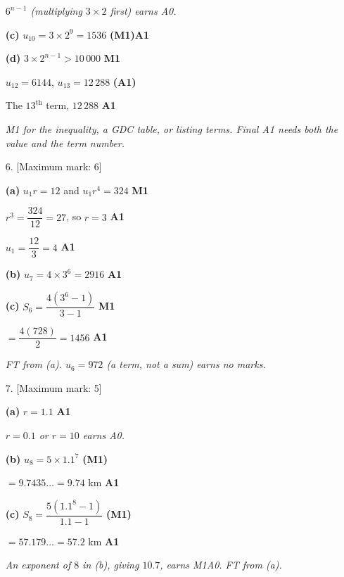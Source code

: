 \documentclass[12pt, twoside]{article}
\begin{document}
\begin{enumerate}[itemsep=0.3cm]
\emph{$6^{n - 1}$ (multiplying $3 \times 2$ first) earns A0.}

\textbf{(c)} $u_{10} = 3 \times 2^{9} = 1536$ \hfill \textbf{(M1)A1}

\textbf{(d)} $3 \times 2^{n - 1} > 10\,000$ \hfill \textbf{M1}

$u_{12} = 6144$, \quad $u_{13} = 12\,288$ \hfill \textbf{(A1)}

The $13^{\text{th}}$ term, $12\,288$ \hfill \textbf{A1}

\emph{M1 for the inequality, a GDC table, or listing terms. Final A1 needs
both the value and the term number.}

\medskip

\item[6.] [Maximum mark: 6]

\textbf{(a)} $u_{1}r = 12$ and $u_{1}r^{4} = 324$ \hfill \textbf{M1}

$r^{3} = \dfrac{324}{12} = 27$, so $r = 3$ \hfill \textbf{A1}

$u_{1} = \dfrac{12}{3} = 4$ \hfill \textbf{A1}

\textbf{(b)} $u_{7} = 4 \times 3^{6} = 2916$ \hfill \textbf{A1}

\textbf{(c)} $S_{6} = \dfrac{4\left(3^{6} - 1\right)}{3 - 1}$
\hfill \textbf{M1}

$= \dfrac{4(728)}{2} = 1456$ \hfill \textbf{A1}

\emph{FT from (a). $u_{6} = 972$ (a term, not a sum) earns no marks.}

\newpage

\item[7.] [Maximum mark: 5]

\textbf{(a)} $r = 1.1$ \hfill \textbf{A1}

\emph{$r = 0.1$ or $r = 10$ earns A0.}

\textbf{(b)} $u_{8} = 5 \times 1.1^{7}$ \hfill \textbf{(M1)}

$= 9.7435\ldots = 9.74$ km \hfill \textbf{A1}

\textbf{(c)} $S_{8} = \dfrac{5\left(1.1^{8} - 1\right)}{1.1 - 1}$
\hfill \textbf{(M1)}

$= 57.179\ldots = 57.2$ km \hfill \textbf{A1}

\emph{An exponent of $8$ in (b), giving $10.7$, earns M1A0. FT from (a).}

\medskip


\end{enumerate}
\end{document}
